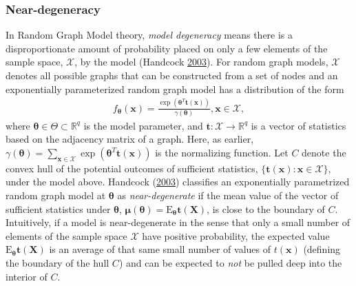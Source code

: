 \documentclass[12pt]{article}
\theoremstyle{definition}
\begin{document}
\subsubsection{Near-degeneracy}\label{near-degeneracy}

In Random Graph Model theory, \emph{model degeneracy} means there is a
disproportionate amount of probability placed on only a few elements of
the sample space, \(\mathcal{X}\), by the model (Handcock
\protect\hyperlink{ref-handcock2003assessing}{2003}). For random graph
models, \(\mathcal{X}\) denotes all possible graphs that can be
constructed from a set of nodes and an exponentially parameterized
random graph model has a distribution of the form
\begin{align*}
f_{\boldsymbol \theta} (\boldsymbol x) = \frac{\exp\left(\boldsymbol \theta^T \boldsymbol t(\boldsymbol x)\right)}{\gamma(\boldsymbol \theta)}, \boldsymbol x \in \mathcal{X},
\end{align*}
where \(\boldsymbol \theta \in \Theta \subset \mathbb{R}^q\) is the
model parameter, and
\(\boldsymbol t: \mathcal{X} \rightarrow \mathbb{R}^q\) is a vector of
statistics based on the adjacency matrix of a graph. Here, as earlier,
\(\gamma(\boldsymbol \theta) = \sum_{\boldsymbol x \in \mathcal{X}} \exp\left(\boldsymbol \theta^T \boldsymbol t(\boldsymbol x)\right)\)
is the normalizing function. Let \(C\) denote the convex hull of the
potential outcomes of sufficient statistics,
\(\{\boldsymbol t(\boldsymbol x): \boldsymbol x \in \mathcal{X}\}\),
under the model above. Handcock
(\protect\hyperlink{ref-handcock2003assessing}{2003}) classifies an
exponentially parametrized random graph model at \(\boldsymbol \theta\)
as \emph{near-degenerate} if the mean value of the vector of sufficient
statistics under \(\boldsymbol \theta\),
\(\boldsymbol \mu(\boldsymbol \theta) = \text{E}_{\boldsymbol \theta}\boldsymbol t( \boldsymbol X)\),
is close to the boundary of \(C\). Intuitively, if a model is
near-degenerate in the sense that only a small number of elements of the
sample space \(\mathcal{X}\) have positive probability, the expected
value \(\text{E}_{\boldsymbol \theta}\boldsymbol t( \boldsymbol X)\) is
an average of that same small number of values of \(t( \boldsymbol x)\)
(defining the boundary of the hull \(C\)) and can be expected to
\emph{not} be pulled deep into the interior of \(C\).
\end{document}
